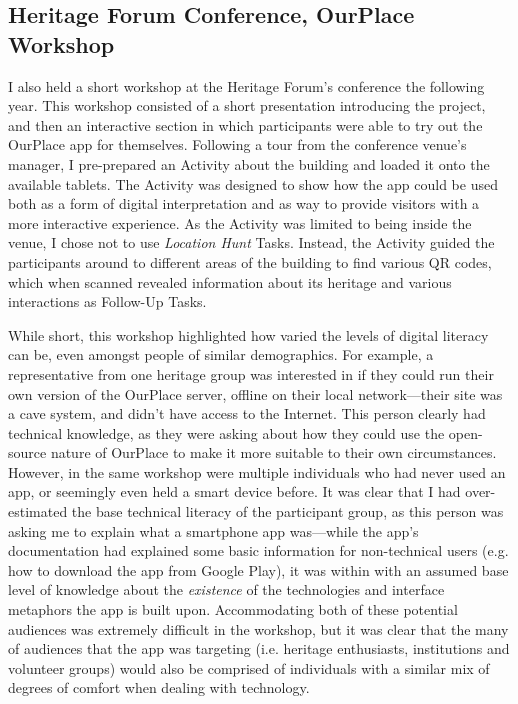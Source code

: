 \subsection{Heritage Forum Conference, OurPlace Workshop}
\label{sec:HeritageOurPlaceWorkshop}

I also held a short workshop at the Heritage Forum's conference the following year. This workshop consisted of a short presentation introducing the project, and then an interactive section in which participants were able to try out the OurPlace app for themselves. Following a tour from the conference venue's manager, I pre-prepared an Activity about the building and loaded it onto the available tablets. The Activity was designed to show how the app could be used both as a form of digital interpretation and as way to provide visitors with a more interactive experience. As the Activity was limited to being inside the venue, I chose not to use \textit{Location Hunt} Tasks. Instead, the Activity guided the participants around to different areas of the building to find various QR codes, which when scanned revealed information about its heritage and various interactions as Follow-Up Tasks.

While short, this workshop highlighted how varied the levels of digital literacy can be, even amongst people of similar demographics. For example, a representative from one heritage group was interested in if they could run their own version of the OurPlace server, offline on their local network---their site was a cave system, and didn't have access to the Internet. This person clearly had technical knowledge, as they were asking about how they could use the open-source nature of OurPlace to make it more suitable to their own circumstances. However, in the same workshop were multiple individuals who had never used an app, or seemingly even held a smart device before. It was clear that I had over-estimated the base technical literacy of the participant group, as this person was asking me to explain what a smartphone app was---while the app's documentation had explained some basic information for non-technical users (e.g. how to download the app from Google Play), it was within with an assumed base level of knowledge about the \textit{existence} of the technologies and interface metaphors the app is built upon. Accommodating both of these potential audiences was extremely difficult in the workshop, but it was clear that the many of audiences that the app was targeting (i.e. heritage enthusiasts, institutions and volunteer groups) would also be comprised of individuals with a similar mix of degrees of comfort when dealing with technology.

